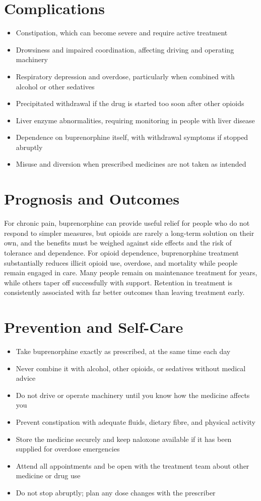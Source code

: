 \section*{Complications}
\begin{itemize}
    \item Constipation, which can become severe and require active treatment
    \item Drowsiness and impaired coordination, affecting driving and operating machinery
    \item Respiratory depression and overdose, particularly when combined with alcohol or other sedatives
    \item Precipitated withdrawal if the drug is started too soon after other opioids
    \item Liver enzyme abnormalities, requiring monitoring in people with liver disease
    \item Dependence on buprenorphine itself, with withdrawal symptoms if stopped abruptly
    \item Misuse and diversion when prescribed medicines are not taken as intended
\end{itemize}

\section*{Prognosis and Outcomes}
For chronic pain, buprenorphine can provide useful relief for people who do not respond to simpler measures, but opioids are rarely a long-term solution on their own, and the benefits must be weighed against side effects and the risk of tolerance and dependence. For opioid dependence, buprenorphine treatment substantially reduces illicit opioid use, overdose, and mortality while people remain engaged in care. Many people remain on maintenance treatment for years, while others taper off successfully with support. Retention in treatment is consistently associated with far better outcomes than leaving treatment early.

\section*{Prevention and Self-Care}
\begin{itemize}
    \item Take buprenorphine exactly as prescribed, at the same time each day
    \item Never combine it with alcohol, other opioids, or sedatives without medical advice
    \item Do not drive or operate machinery until you know how the medicine affects you
    \item Prevent constipation with adequate fluids, dietary fibre, and physical activity
    \item Store the medicine securely and keep naloxone available if it has been supplied for overdose emergencies
    \item Attend all appointments and be open with the treatment team about other medicine or drug use
    \item Do not stop abruptly; plan any dose changes with the prescriber
\end{itemize}

